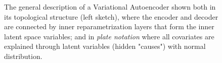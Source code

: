 %
\begin{figure}
    \centering
    \caption{ The general description of a Variational Autoencoder shown both in its topological structure (left sketch), where the encoder and decoder are connected by inner reparametrization layers that form the inner latent space variables; and in \textit{plate notation} where all covariates are explained through latent variables (hidden "causes") with normal distribution. }
    \label{fig:step_1_VAE}
\end{figure}










%


